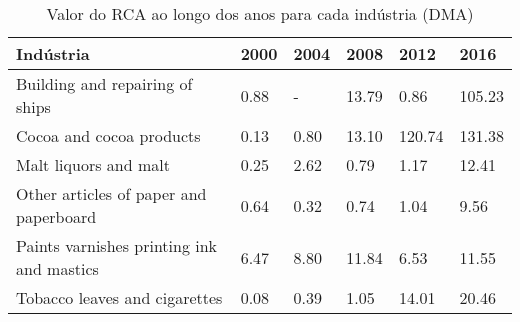 \begin{table}
\centering
\caption{Valor do RCA ao longo dos anos para cada indústria (DMA)}
\label{tab:ex3-tempo-DMA}
\begin{tabular}{p{6cm}p{1.5cm}p{1.5cm}p{1.5cm}p{1.5cm}p{1.5cm}}
\toprule
                                Indústria & 2000 & 2004 &  2008 &   2012 &   2016 \\
\midrule
          Building and repairing of ships & 0.88 &    - & 13.79 &   0.86 & 105.23 \\
                 Cocoa and cocoa products & 0.13 & 0.80 & 13.10 & 120.74 & 131.38 \\
                    Malt liquors and malt & 0.25 & 2.62 &  0.79 &   1.17 &  12.41 \\
   Other articles of paper and paperboard & 0.64 & 0.32 &  0.74 &   1.04 &   9.56 \\
Paints varnishes printing ink and mastics & 6.47 & 8.80 & 11.84 &   6.53 &  11.55 \\
            Tobacco leaves and cigarettes & 0.08 & 0.39 &  1.05 &  14.01 &  20.46 \\
\bottomrule
\end{tabular}
\end{table}
